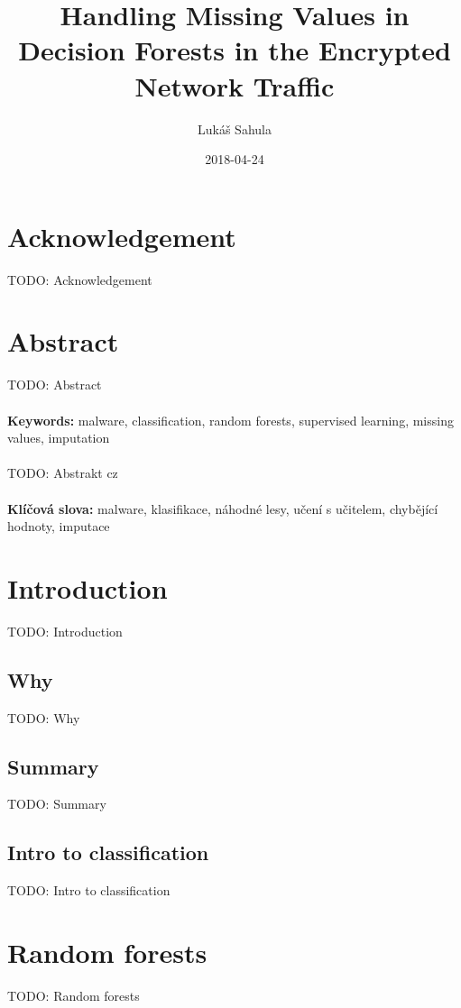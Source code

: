 \documentclass[11pt]{article}
\title{Handling Missing Values in Decision Forests in the Encrypted Network Traffic}
\date{2018-04-24}
\author{Lukáš Sahula}
\begin{document}
  \maketitle
  \newpage
  \section*{Acknowledgement}
    TODO: Acknowledgement
  \newpage
  \section*{Abstract}
    TODO: Abstract
    \\~\\
    {\bf Keywords:} malware, classification, random forests, supervised learning, missing values, imputation 
    \\~\\
    TODO: Abstrakt cz
    \\~\\
    {\bf Klíčová slova:} malware, klasifikace, náhodné lesy, učení s učitelem, chybějící hodnoty, imputace 
  \newpage
  \tableofcontents
  \newpage

  \section*{Introduction}
    TODO: Introduction
    \subsection{Why}
      TODO: Why
    \subsection{Summary}
      TODO: Summary
    \subsection{Intro to classification}
      TODO: Intro to classification
  \newpage
  \section{Random forests}
    TODO: Random forests
  \newpage
\end{document}
